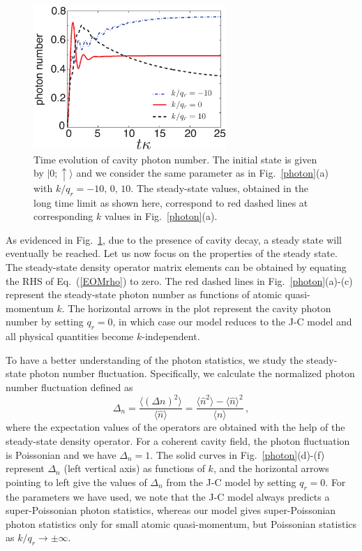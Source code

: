 \documentclass[atoms,article,submit,moreauthors,dvi2pdf,12pt,a4paper]{mdpi}
\begin{document}
\begin{figure}[htp]
\includegraphics[width=0.65\textwidth]{photon_evolution}\caption{Time evolution of cavity photon number. The initial state is given by $|0;\uparrow\rangle$ and we consider the same parameter as in Fig.~\ref{photon}(a) with $k/q_r=-10,\,0,\,10$. The steady-state values, obtained in the long time limit as shown here, correspond to red dashed lines at corresponding $k$ values in Fig.~\ref{photon}(a).}\label{evo}
\end{figure}

As evidenced in Fig.~\ref{evo}, due to the presence of cavity decay, a steady state will eventually be reached. Let us now focus on the properties of the steady state. The steady-state density operator matrix elements can be obtained by equating the RHS of Eq.~(\ref{EOMrho}) to zero. The red dashed lines in Fig.~\ref{photon}(a)-(c) represent the steady-state photon number as functions of atomic quasi-momentum $k$. The horizontal arrows in the plot represent the cavity photon number by setting $q_r=0$, in which case our model reduces to the J-C model and all physical quantities become $k$-independent.

To have a better understanding of the photon statistics, we study the steady-state photon number fluctuation. Specifically, we calculate the normalized photon number fluctuation defined as
\[\Delta_n = \frac{\langle(\Delta n)^{2}\rangle}{\langle \hat{n}\rangle}=\frac{\langle \hat{n}^{2}\rangle-\langle \hat{n}\rangle^{2}}{\langle n\rangle} \,,\]
where the expectation values of the operators are obtained with the help of the steady-state density operator. For a coherent cavity field, the photon fluctuation is Poissonian and we have $\Delta_n=1$.
The solid curves in Fig.~\ref{photon}(d)-(f) represent $\Delta_n$ (left vertical axis) as functions of $k$, and the horizontal arrows pointing to left give the values of $\Delta_n$ from the J-C model by setting $q_r=0$. For the parameters we have used, we note that the J-C model always predicts a super-Poissonian photon statistics, whereas our model gives super-Poissonian photon statistics only for small atomic quasi-momentum, but Poissonian statistics as $k/q_r \rightarrow \pm \infty$.
\end{document}
